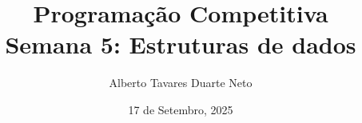 \documentclass{beamer}
\title{{\Large Programação Competitiva}\\ Semana 5: Estruturas de dados}
\date{17 de Setembro, 2025}
\author{Alberto Tavares Duarte Neto}
\institute{Universidade de Brasília}
\numberwithin{equation}{subsection}
\begin{document}
    \maketitle
    \small







    
    
    
    
    
    

    
    
    
    
\end{document}
